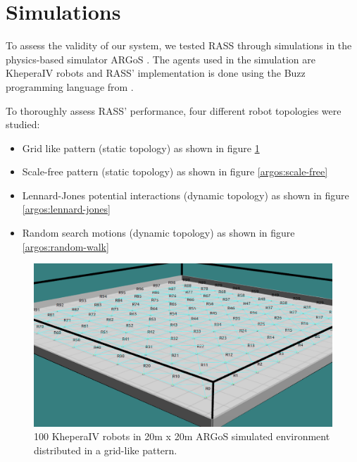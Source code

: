 \section{Simulations}

To assess the validity of our system, we tested RASS through simulations in the physics-based simulator ARGoS \cite{Pinciroli:SI2012}. The agents used
in the simulation are KheperaIV robots \cite{kteam2021kheperaiv} and RASS' implementation is done using the Buzz programming language from \cite{pinciroliBuzz2016}.

To thoroughly assess RASS' performance, four different robot topologies were studied:

\begin{itemize}
    \item Grid like pattern (static topology) as shown in figure \ref{argos:grid}
    \item Scale-free pattern (static topology) as shown in figure \ref{argos:scale-free}
    \item Lennard-Jones potential interactions (dynamic topology) as shown in figure \ref{argos:lennard-jones}
    \item Random search motions (dynamic topology) as shown in figure \ref{argos:random-walk}
\end{itemize}

\begin{figure}[H]
	\centering
    \includegraphics[width=\columnwidth]{images/argos_grid_link.png}
    \caption[Grid formation in ARGoS]{100 KheperaIV robots in 20m x 20m  ARGoS simulated environment distributed in a grid-like pattern.}
    \label{argos:grid}
\end{figure}

